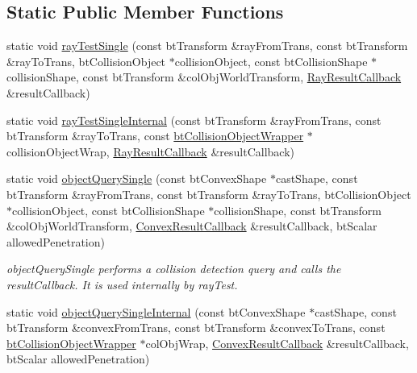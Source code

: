 \subsection*{Static Public Member Functions}
\begin{DoxyCompactItemize}
\item 
static void \hyperlink{classbt_collision_world_aca2a9413508b4a2449fe83ff93ea564e}{ray\+Test\+Single} (const bt\+Transform \&ray\+From\+Trans, const bt\+Transform \&ray\+To\+Trans, bt\+Collision\+Object $\ast$collision\+Object, const bt\+Collision\+Shape $\ast$collision\+Shape, const bt\+Transform \&col\+Obj\+World\+Transform, \hyperlink{structbt_collision_world_1_1_ray_result_callback}{Ray\+Result\+Callback} \&result\+Callback)
\item 
static void \hyperlink{classbt_collision_world_a84bbeea09de9dc5c68e49826e58f7114}{ray\+Test\+Single\+Internal} (const bt\+Transform \&ray\+From\+Trans, const bt\+Transform \&ray\+To\+Trans, const \hyperlink{structbt_collision_object_wrapper}{bt\+Collision\+Object\+Wrapper} $\ast$collision\+Object\+Wrap, \hyperlink{structbt_collision_world_1_1_ray_result_callback}{Ray\+Result\+Callback} \&result\+Callback)
\item 
\hypertarget{classbt_collision_world_aa63de55ff9451a80c8c825cafd64d9ba}{static void \hyperlink{classbt_collision_world_aa63de55ff9451a80c8c825cafd64d9ba}{object\+Query\+Single} (const bt\+Convex\+Shape $\ast$cast\+Shape, const bt\+Transform \&ray\+From\+Trans, const bt\+Transform \&ray\+To\+Trans, bt\+Collision\+Object $\ast$collision\+Object, const bt\+Collision\+Shape $\ast$collision\+Shape, const bt\+Transform \&col\+Obj\+World\+Transform, \hyperlink{structbt_collision_world_1_1_convex_result_callback}{Convex\+Result\+Callback} \&result\+Callback, bt\+Scalar allowed\+Penetration)}\label{classbt_collision_world_aa63de55ff9451a80c8c825cafd64d9ba}

\begin{DoxyCompactList}\small\item\em object\+Query\+Single performs a collision detection query and calls the result\+Callback. It is used internally by ray\+Test. \end{DoxyCompactList}\item 
static void \hyperlink{classbt_collision_world_a2312e2da71f0d7646a4dc19a4966bed0}{object\+Query\+Single\+Internal} (const bt\+Convex\+Shape $\ast$cast\+Shape, const bt\+Transform \&convex\+From\+Trans, const bt\+Transform \&convex\+To\+Trans, const \hyperlink{structbt_collision_object_wrapper}{bt\+Collision\+Object\+Wrapper} $\ast$col\+Obj\+Wrap, \hyperlink{structbt_collision_world_1_1_convex_result_callback}{Convex\+Result\+Callback} \&result\+Callback, bt\+Scalar allowed\+Penetration)
\end{DoxyCompactItemize}
